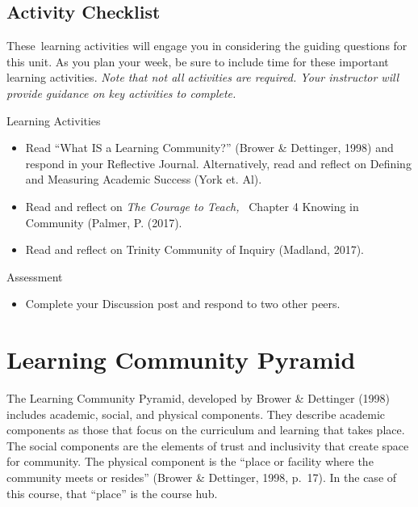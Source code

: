 \documentclass[
]{book}
\providecommand{\tightlist}{%
  \setlength{\itemsep}{0pt}\setlength{\parskip}{0pt}}
\begin{document}
\hypertarget{activity-checklist-3}{%
\subsection*{Activity Checklist}\label{activity-checklist-3}}

These~learning activities will engage you in considering the guiding questions for this unit. As you plan your week, be sure to include time for these important learning activities. \emph{Note that not all activities are required. Your instructor will provide guidance on key activities to complete.}

\begin{reflect}
{Learning Activities}

\begin{itemize}
\tightlist
\item
  Read ``What IS a Learning Community?'' (Brower \& Dettinger, 1998) and respond in your Reflective Journal. Alternatively, read and reflect on Defining and Measuring Academic Success (York et. Al).\\
\item
  Read and reflect on \emph{The Courage to Teach,} ~Chapter 4 Knowing in Community (Palmer, P. (2017).\\
\item
  Read and reflect on Trinity Community of Inquiry (Madland, 2017).
\end{itemize}
\end{reflect}

\begin{assessment}
{Assessment}

\begin{itemize}
\tightlist
\item
  Complete your Discussion post and respond to two other peers.
\end{itemize}
\end{assessment}

\hypertarget{learning-community-pyramid}{%
\section{Learning Community Pyramid}\label{learning-community-pyramid}}

The Learning Community Pyramid, developed by Brower \& Dettinger (1998) includes academic, social, and physical components. They describe academic components as those that focus on the curriculum and learning that takes place. The social components are the elements of trust and inclusivity that create space for community. The physical component is the ``place or facility where the community meets or resides'' (Brower \& Dettinger, 1998, p.~17). In the case of this course, that ``place'' is the course hub.
\end{document}
